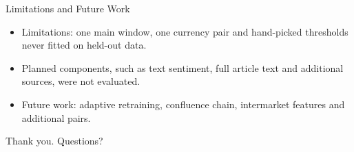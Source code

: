 \documentclass[aspectratio=169,17pt]{beamer}
\begin{document}
\begin{frame}{Limitations and Future Work}
  \begin{itemize}
    \item Limitations: one main window, one currency pair and hand-picked thresholds never fitted on held-out data.
    \item Planned components, such as text sentiment, full article text and additional sources, were not evaluated.
    \item Future work: adaptive retraining, confluence chain, intermarket features and additional pairs.
  \end{itemize}
\end{frame}

\begin{frame}
  \centering
  {\Large Thank you. Questions?}
\end{frame}
\end{document}
